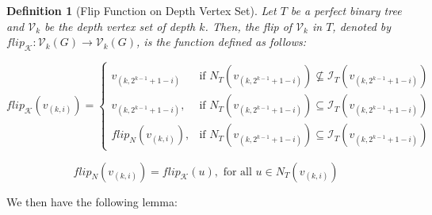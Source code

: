 \documentclass[11pt,a4paper]{article}
\newtheorem{definition}[theorem]{Definition}
\theoremstyle{definition}
\begin{document}
\begin{definition}[Flip Function on Depth Vertex Set]
	Let $T$ be a perfect binary tree and $\mathcal{V}_k$ be the depth vertex set of depth $k$. Then, the flip of $\mathcal{V}_k$ in $T$, denoted by $flip_\mathcal{K}: \mathcal{V}_k(G) \rightarrow \mathcal{V}_k(G)$, is the function defined as follows:

	\begin{equation*}
		flip_\mathcal{K}(v_{(k, i)}) = \begin{cases}
			v_{(k, 2^{k-1} + 1 - i)}  & \text{if } N_T(v_{(k, 2^{k - 1} + 1 - i)}) \not\subseteq \mathcal{I}_T(v_{(k, 2^{k - 1} + 1 - i)}) \\
			v_{(k, 2^{k-1} + 1 - i)}, & \text{if } N_T(v_{(k, 2^{k - 1} + 1 - i)}) \subseteq \mathcal{I}_T(v_{(k, 2^{k - 1} + 1 - i)})     \\
			flip_N(v_{(k, i)}),       & \text{if } N_T(v_{(k, 2^{k - 1} + 1 - i)}) \subseteq \mathcal{I}_T(v_{(k, 2^{k - 1} + 1 - i)})
		\end{cases}
	\end{equation*}

	\begin{equation*}
		flip_N(v_{(k, i)}) =  flip_\mathcal{K}(u), \text{ for all } u \in N_T(v_{(k, i)})
	\end{equation*}
\end{definition}

We then have the following lemma:
\end{document}

